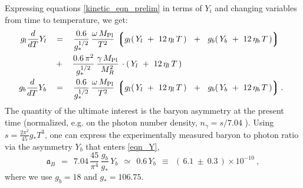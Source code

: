\documentclass[12pt]{revtex4}
\newcommand{\lgr}{\left\lgroup}
\newcommand{\rgr}{\right\rgroup}
\newcommand{\Mpl}{M_{\rm Pl}}
\begin{document}
	Expressing equations \eqref{kinetic_eqn_prelim} in terms of
	$ Y_i $ and changing variables from time to temperature, we get:
\begin{equation}
\label{eqn_Y}
\begin{split}
	g_l \frac{d}{dT}Y_l 
	& ~~\;=~~\;
	\frac{0.6}{g_*^{1/2}}\, 
	\frac{\omega\,\Mpl}{T^2}\,
	\lgr g_l (\,Y_l~+~12\,\eta_l\,T\,) ~~+~~ 
	     g_b (\,Y_b~+~12\,\eta_b\,T\,)  \rgr 
	\;~~%
	\\
	& \;~~+~~\;  
	\frac{0.6\,\pi^2}{g_*^{1/2}}\, 
	\frac{\gamma\,\Mpl}{M_R^2}\,
	\cdot (\, Y_l ~+~ 12\,\eta_l\,T\,)\\
	g_b \frac{d}{dT}Y_b 
	& ~~\;=~~\;
	\frac{0.6}{g_*^{1/2}}\, 
	\frac{\omega\,\Mpl}{T^2}\,
	\lgr g_l (\,Y_l~+~12\,\eta_l\,T\,) ~~+~~ 
	     g_b (\,Y_b~+~12\,\eta_b\,T\,)  \rgr .
\end{split}
\end{equation}
	The quantity of the ultimate interest is the baryon asymmetry 
	at the present time (normalized, e.g. on the photon number density,
	$ n_\gamma = s / 7.04 $ \cite{Kolb:1990vq}). 
	Using $ s = \frac{2\pi^2}{45} g_* T^3 $, one can express the experimentally measured 
	baryon to photon ratio via the asymmetry $Y_{b}$ that enters \eqref{eqn_Y},
\begin{equation}
\label{def_asy}
	\mathfrak{a}_B ~~=~~ 7.04\, \frac{45}{\pi^4}\, \frac{g_b}{g_*}\, Y_b
	~~\simeq~~ 0.6 \, Y_b 
		~~\equiv~~ (\, 6.1 ~\pm~ 0.3 \,)\times 10^{-10}~,
\end{equation}
where we  use $ g_b = 18 $ and $g_* = 106.75 $. 
\end{document}
